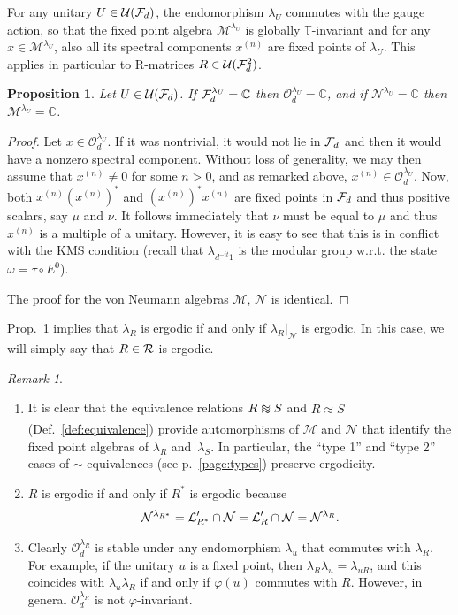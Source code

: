 \documentclass[12pt,a4paper]{amsart}
\numberwithin{equation}{section}
\newtheorem{proposition}[theorem]{Proposition}
\theoremstyle{remark}
\newtheorem{remark}[theorem]{Remark}
\newcommand{\Cl}{\mathbb{C}}
\newcommand{\la}{\lambda}
\newcommand{\CM}[0]{\mathcal{M}} \newcommand{\CN}[0]{\mathcal{N}}
\newcommand{\CO}[0]{\mathcal{O}} \newcommand{\CP}[0]{\mathcal{P}}
\newcommand{\CU}[0]{\mathcal{U}} \newcommand{\CV}[0]{\mathcal{V}}
\def\apeqA{\SavedStyle\sim}
\def\Msim{\setstackgap{L}{\dimexpr.5pt+1.5\LMpt}\ensurestackMath{%
  \ThisStyle{\mathrel{\Centerstack{{\apeqA} {\apeqA} {\apeqA}}}}}}
\def\Nsim{\approx}
\begin{document}
For any unitary $U\in\CU(\CF_d)$, the endomorphism $\la_U$ commutes with the gauge action, so that the fixed point algebra $\CM^{\lambda_U}$ is globally ${\mathbb T}$-invariant and for any $x\in\CM^{\lambda_U}$, also all its spectral components $x^{(n)}$ are fixed points of $\la_U$. This applies in particular to R-matrices $R\in\CU(\CF_d^2)$.

\medskip


\begin{proposition}\label{prop:ergodicityFvsO}
	Let $U\in\CU(\CF_d)$. If $\CF_d^{\lambda_U}=\Cl$ then $\CO_d^{\lambda_U} = \Cl$, and if $\CN^{\lambda_U}= \Cl$ then $\CM^{\lambda_U} = \Cl$.
\end{proposition}
\begin{proof}
	Let $x \in\CO_d^{\lambda_U}$. If it was nontrivial, it would not lie in $\mathcal{F}_d$ and then it would have a nonzero spectral component. Without loss of generality, we may then assume that $x^{(n)} \neq 0$ for some $n >0$, and as remarked above, $x^{(n)}\in\CO_d^{\la_U}$. Now, both $x^{(n)} (x^{(n)})^*$ and $(x^{(n)})^* x^{(n)}$ are fixed points in $\mathcal{F}_d$ and thus positive scalars, say $\mu$ and $\nu$. It follows immediately that $\nu$ must be equal to $\mu$ and thus $x^{(n)}$ is a multiple of a unitary. However, it is easy to see that this is in conflict with the KMS condition
	(recall that $\lambda_{d^{-it}1}$ is the modular group w.r.t. the state $\omega = \tau \circ E^0$).
	
	The proof for the von Neumann algebras $\CM$, $\CN$ is identical.
\end{proof}


Prop.~\ref{prop:ergodicityFvsO} implies that $\la_R$ is ergodic if and only if ${\la_R}|_{\CN}$ is ergodic. In this case, we will simply say that $R\in\mathcal{R}$ is ergodic. 

\begin{remark}\label{remark:stability-of-ergodicity}
    \leavevmode
   \begin{enumerate}
        \item It is clear that the equivalence relations $R\Msim S$ and $R\Nsim S$ (Def.~\ref{def:equivalence}) provide automorphisms of $\CM$ and $\CN$ that identify the fixed point algebras of $\la_R$ and~$\la_S$. In particular, the ``type 1'' and ``type 2'' cases of $\sim$ equivalences (see p.~\ref{page:types}) preserve ergodicity. 
        
        \item $R$ is ergodic if and only if $R^*$ is ergodic because
        \begin{align}
            \CN^{\la_{R^*}}=\CL_{R^*}'\cap\CN=\CL_{R}'\cap\CN=\CN^{\la_R}.
        \end{align}
        
        \item Clearly $\CO_d^{\la_R}$ is stable under any endomorphism $\la_u$ that commutes with $\la_R$. For example, if the unitary $u$ is a fixed point, then $\lambda_R \lambda_u = \lambda_{uR}$, and this coincides with $\lambda_u \lambda_R$ if and only if $\varphi(u)$ commutes with $R$. However, in general $\CO_d^{\lambda_R}$ is not $\varphi$-invariant.
    \end{enumerate}
\end{remark}
\end{document}
